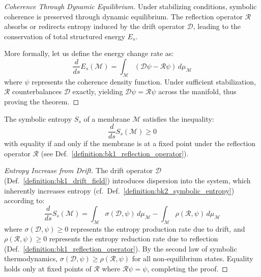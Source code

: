 \begin{proof}[Coherence Through Dynamic Equilibrium]
\label{proof:bk5_coherence_through_dynamic_equilibriium}
Under stabilizing conditions, symbolic coherence is preserved through dynamic equilibrium. 
The reflection operator $\mathcal{R}$ absorbs or redirects entropy induced by the drift operator 
$\mathcal{D}$, leading to the conservation of total structured energy $E_s$. 

More formally, let us define the energy change rate as:
\begin{equation}
\frac{d}{ds} E_s(\mathcal{M}) = \int_{\mathcal{M}} \left( \mathcal{D} \psi - \mathcal{R} \psi \right) \, d\mu_{\mathcal{M}}
\end{equation}
\noindent where $\psi$ represents the coherence density function. Under sufficient stabilization, 
$\mathcal{R}$ counterbalances $\mathcal{D}$ exactly, yielding 
$\mathcal{D}\psi = \mathcal{R}\psi$ across the manifold, thus proving the theorem.
\end{proof}
\begin{theorem} \label{theorem:bk5_symbolic_entropy_production}
The symbolic entropy $S_s$ of a membrane $\mathcal{M}$ satisfies the inequality:
\begin{equation}
\frac{d}{ds} S_s(\mathcal{M}) \geq 0
\end{equation}
\noindent with equality if and only if the membrane is at a fixed point under the reflection operator $\mathcal{R}$ (see Def.~\ref{definition:bk1_reflection_operator}).
\end{theorem}

\begin{proof}[Entropy Increase from Drift]
\label{proof:bk5_entropy_increase_from_drift}
The drift operator $\mathcal{D}$ (Def.~\ref{definition:bk1_drift_field}) introduces dispersion into the system, which inherently increases entropy (cf.~Def.~\ref{definition:bk2_symbolic_entropy}) according to:
\begin{equation}
\frac{d}{ds} S_s(\mathcal{M}) = \int_{\mathcal{M}} \sigma(\mathcal{D}, \psi) \, d\mu_{\mathcal{M}} - \int_{\mathcal{M}} \rho(\mathcal{R}, \psi) \, d\mu_{\mathcal{M}}
\end{equation}
\noindent where $\sigma(\mathcal{D}, \psi) \geq 0$ represents the entropy production rate due to drift, and $\rho(\mathcal{R}, \psi) \geq 0$ represents the entropy reduction rate due to reflection (Def.~\ref{definition:bk1_reflection_operator}).
By the second law of symbolic thermodynamics, $\sigma(\mathcal{D}, \psi) \geq \rho(\mathcal{R}, \psi)$ for all non-equilibrium states. Equality holds only at fixed points of $\mathcal{R}$ where $\mathcal{R}\psi = \psi$, completing the proof.
\end{proof}

